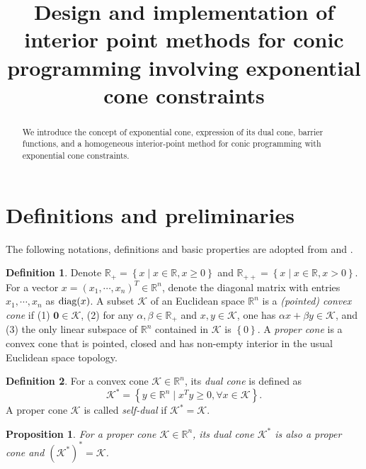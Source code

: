 \documentclass[11pt]{article}
\title{Design and implementation of interior point methods for conic programming involving exponential cone constraints}
\theoremstyle{definition}
\newtheorem{defin}{Definition}
\theoremstyle{plain}
\newtheorem{prop}{Proposition}
\def\diagonal{\protect{\textnormal{diag}}}
\begin{document}
\maketitle

\begin{abstract}
We introduce the concept of exponential cone, expression of its dual cone, barrier functions, and a homogeneous interior-point method for conic programming with exponential cone constraints.
\end{abstract}

\section{Definitions and preliminaries}
The following notations, definitions and basic properties are adopted from \cite{Robert_thesis} and \cite{Akle_thesis}.

\begin{defin} Denote $\mathbb{R}_+ = \left\{x \mid x\in \mathbb{R}, x\geq 0\right\}$ and $\mathbb{R}_{++} = \left\{x \mid x\in \mathbb{R}, x> 0\right\}$. For a vector $x = (x_1, \cdots, x_n)^T \in \mathbb{R}^n$, denote the diagonal matrix with entries $x_1, \cdots, x_n$ as $\diagonal(x)$. A subset $\mathcal{K}$ of an Euclidean space $\mathbb{R}^n$ is a \textit{(pointed) convex cone} if (1) $\mathbf{0} \in \mathcal{K}$, (2) for any $\alpha, \beta \in \mathbb{R}_+$ and $x,y \in \mathcal{K}$, one has $\alpha x + \beta y \in \mathcal{K}$, and (3) the only linear subspace of $\mathbb{R}^n$ contained in $\mathcal{K}$ is $\left\{0\right\}$. A \textit{proper cone} is a convex cone that is pointed, closed and has non-empty interior in the usual Euclidean space topology.
\end{defin}

\begin{defin}
	For a convex cone $\mathcal{K} \in \mathbb{R}^n$, its \textit{dual cone} is defined as 
	\[\mathcal{K}^* = \left\{y\in \mathbb{R}^n \mid x^T y\geq 0, \forall x \in \mathcal{K} \right\}.\]
	A proper cone $\mathcal{K}$ is called \textit{self-dual} if $\mathcal{K}^* = \mathcal{K}$.
\end{defin}
\begin{prop}
	For a proper cone $\mathcal{K} \in \mathbb{R}^n$, its dual cone $\mathcal{K}^*$ is also a proper cone and  $(\mathcal{K}^*)^* = \mathcal{K}$. 
\end{prop}
\end{document}
